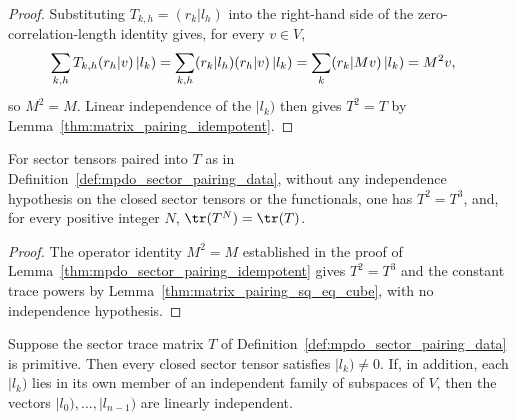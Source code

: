 \begin{proof}
    \leanok
    Substituting $T_{k,h}=(r_k|l_h)$ into the right-hand side of the
    zero-correlation-length identity gives, for every $v\in V$,
    \begin{align}
        \sum_{k,h}T_{k,h}(r_h|v)\,|l_k)
         & =\sum_{k,h}(r_k|l_h)(r_h|v)\,|l_k)
        =\sum_k(r_k|Mv)\,|l_k)
        =M^2v,
        \notag
    \end{align}
    so $M^2=M$. Linear independence of the $|l_k)$ then gives $T^2=T$ by
    Lemma~\ref{thm:matrix_pairing_idempotent}.
\end{proof}

\begin{lemma}
    \label{thm:mpdo_sector_pairing_trace_powers}
    \leanok
    For sector tensors paired into $T$ as in
    Definition~\ref{def:mpdo_sector_pairing_data}, without any independence
    hypothesis on the closed sector tensors or the functionals, one has
    $T^2=T^3$, and, for every positive integer $N$,
    $\tr(T^N)=\tr(T)$.
\end{lemma}

\begin{proof}
    \leanok
    The operator identity $M^2=M$ established in the proof of
    Lemma~\ref{thm:mpdo_sector_pairing_idempotent} gives $T^2=T^3$ and
    the constant trace powers by Lemma~\ref{thm:matrix_pairing_sq_eq_cube},
    with no independence hypothesis.
\end{proof}

\begin{lemma}
    \label{thm:mpdo_sector_tensors_independent}
    \leanok
    Suppose the sector trace matrix $T$ of
    Definition~\ref{def:mpdo_sector_pairing_data} is primitive. Then every
    closed sector tensor satisfies $|l_k)\neq0$. If, in addition, each
    $|l_k)$ lies in its own member of an independent family of subspaces of
    $V$, then the vectors $|l_0),\ldots,|l_{n-1})$ are linearly independent.
\end{lemma}

